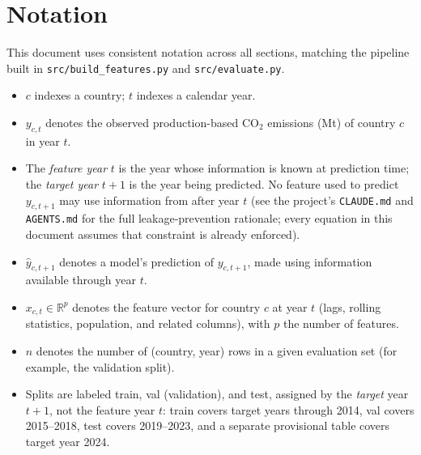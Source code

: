 \section{Notation}
\label{sec:notation}

This document uses consistent notation across all sections, matching the
pipeline built in \texttt{src/build\_features.py} and \texttt{src/evaluate.py}.

\begin{itemize}
  \item $c$ indexes a country; $t$ indexes a calendar year.
  \item $y_{c,t}$ denotes the observed production-based CO$_2$ emissions
    (Mt) of country $c$ in year $t$.
  \item The \emph{feature year} $t$ is the year whose information is known
    at prediction time; the \emph{target year} $t+1$ is the year being
    predicted. No feature used to predict $y_{c,t+1}$ may use information
    from after year $t$ (see the project's \texttt{CLAUDE.md} and
    \texttt{AGENTS.md} for the full leakage-prevention rationale; every
    equation in this document assumes that constraint is already
    enforced).
  \item $\hat y_{c,t+1}$ denotes a model's prediction of $y_{c,t+1}$, made
    using information available through year $t$.
  \item $x_{c,t} \in \mathbb{R}^p$ denotes the feature vector for country
    $c$ at year $t$ (lags, rolling statistics, population, and related
    columns), with $p$ the number of features.
  \item $n$ denotes the number of (country, year) rows in a given
    evaluation set (for example, the validation split).
  \item Splits are labeled train, val (validation), and test, assigned by
    the \emph{target} year $t+1$, not the feature year $t$: train covers
    target years through 2014, val covers 2015--2018, test covers
    2019--2023, and a separate provisional table covers target year 2024.
\end{itemize}
